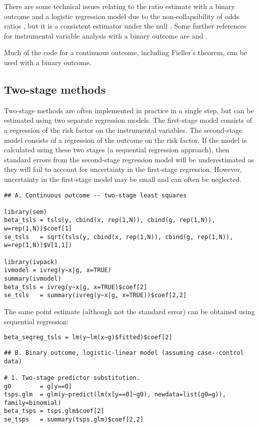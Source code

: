 \documentclass[a4paper,12pt]{article} %
\begin{document}
There are some technical issues relating to the ratio estimate with a binary outcome and a logistic regression model due to the non-collapsibility of odds ratios \citep{greenland1999}, but it is a consistent estimator under the null \citep{vansteelandt2010}. Some further references for instrumental variable analysis with a binary outcome are \cite{palmer2011b} and \cite{clarke2012}.

Much of the code for a continuous outcome, including Fieller's theorem, can be used with a binary outcome.

\clearpage

\subsection{Two-stage methods}
Two-stage methods are often implemented in practice in a single step, but can be estimated using two separate regression models. The first-stage model consists of a regression of the risk factor on the instrumental variables. The second-stage model consists of a regression of the outcome on the risk factor. If the model is calculated using these two stages (a sequential regression approach), then standard errors from the second-stage regression model will be underestimated as they will fail to account for uncertainty in the first-stage regression. However, uncertainty in the first-stage model may be small and can often be neglected.

\begin{lstlisting}
## A. Continuous outcome -- two-stage least squares

library(sem)
beta_tsls = tsls(y, cbind(x, rep(1,N)), cbind(g, rep(1,N)), w=rep(1,N))$coef[1]
se_tsls   = sqrt(tsls(y, cbind(x, rep(1,N)), cbind(g, rep(1,N)), w=rep(1,N))$V[1,1])

library(ivpack)
ivmodel = ivreg(y~x|g, x=TRUE)
summary(ivmodel)
beta_tsls = ivreg(y~x|g, x=TRUE)$coef[2]
se_tsls   = summary(ivreg(y~x|g, x=TRUE))$coef[2,2]
\end{lstlisting}

The same point estimate (although not the standard error) can be obtained using sequential regression:

\begin{lstlisting}
beta_seqreg_tsls = lm(y~lm(x~g)$fitted)$coef[2]
\end{lstlisting}

\begin{lstlisting}
## B. Binary outcome, logistic-linear model (assuming case--control data)

# 1. Two-stage predictor substitution.
g0        = g[y==0]
tsps.glm  = glm(y~predict(lm(x[y==0]~g0), newdata=list(g0=g)), family=binomial)
beta_tsps = tsps.glm$coef[2]
se_tsps   = summary(tsps.glm)$coef[2,2]
\end{lstlisting}
\end{document}
